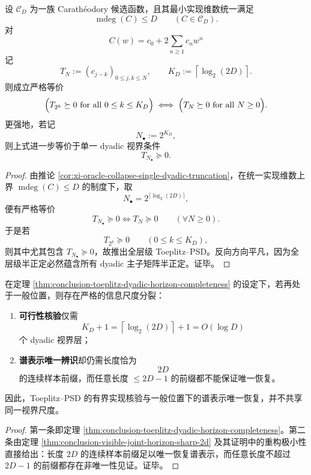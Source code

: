 \begin{theorem}\label{thm:conclusion-toeplitz-dyadic-horizon-completeness}
设 \(\mathcal C_D\) 为一族 Carath\'eodory 候选函数，且其最小实现维数统一满足
\[
\operatorname{mdeg}(C)\le D
\qquad (C\in \mathcal C_D).
\]
对
\[
C(w)=c_0+2\sum_{n\ge 1}c_n w^n
\]
记
\[
T_N:=(c_{j-k})_{0\le j,k\le N},
\qquad
K_D:=\left\lceil \log_2(2D)\right\rceil.
\]
则成立严格等价
\[
\Bigl(T_{2^k}\succeq 0 \ \text{for all } 0\le k\le K_D\Bigr)
\iff
\Bigl(T_N\succeq 0 \ \text{for all } N\ge 0\Bigr).
\]
更强地，若记
\[
N_\bullet:=2^{K_D},
\]
则上式进一步等价于单一 dyadic 视界条件
\[
T_{N_\bullet}\succeq 0.
\]
\end{theorem}

\begin{proof}
由推论 \ref{cor:xi-oracle-collapse-single-dyadic-truncation}，在统一实现维数上界 \(\operatorname{mdeg}(C)\le D\) 的制度下，取
\[
N_\bullet=2^{\lceil \log_2(2D)\rceil},
\]
便有严格等价
\[
T_{N_\bullet}\succeq 0
\iff
T_N\succeq 0 \qquad (\forall N\ge 0).
\]
于是若
\[
T_{2^k}\succeq 0 \qquad (0\le k\le K_D),
\]
则其中尤其包含 \(T_{N_\bullet}\succeq 0\)，故推出全层级 Toeplitz--PSD。反向方向平凡，因为全层级半正定必然蕴含所有 dyadic 主子矩阵半正定。证毕。
\end{proof}

\begin{corollary}[可行性与可辨识性的视界分裂]\label{cor:conclusion-toeplitz-feasibility-identification-horizon-splitting}
在定理 \ref{thm:conclusion-toeplitz-dyadic-horizon-completeness} 的设定下，若再处于一般位置，则存在严格的信息尺度分裂：
\begin{enumerate}
  \item \textbf{可行性核验}仅需
  \[
  K_D+1
  =
  \left\lceil \log_2(2D)\right\rceil+1
  =
  O(\log D)
  \]
  个 dyadic 视界层；
  \item \textbf{谱表示唯一辨识}却仍需长度恰为
  \[
  2D
  \]
  的连续样本前缀，而任意长度 \(\le 2D-1\) 的前缀都不能保证唯一恢复。
\end{enumerate}
因此，Toeplitz--PSD 的有界实现核验与一般位置下的谱表示唯一恢复，并不共享同一视界尺度。
\end{corollary}

\begin{proof}
第一条即定理 \ref{thm:conclusion-toeplitz-dyadic-horizon-completeness}。第二条由定理 \ref{thm:conclusion-visible-joint-horizon-sharp-2d} 及其证明中的重构极小性直接给出：长度 \(2D\) 的连续样本前缀足以唯一恢复谱表示，而任意长度不超过 \(2D-1\) 的前缀都存在非唯一性见证。证毕。
\end{proof}

